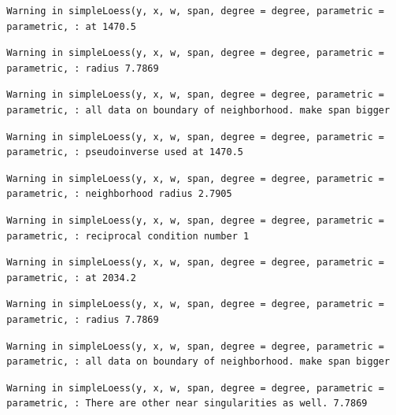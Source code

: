 \documentclass[12pt,twoside]{reedthesis}
\begin{document}
  \begin{verbatim}
  Warning in simpleLoess(y, x, w, span, degree = degree, parametric =
  parametric, : at 1470.5
  \end{verbatim}
  
  \begin{verbatim}
  Warning in simpleLoess(y, x, w, span, degree = degree, parametric =
  parametric, : radius 7.7869
  \end{verbatim}
  
  \begin{verbatim}
  Warning in simpleLoess(y, x, w, span, degree = degree, parametric =
  parametric, : all data on boundary of neighborhood. make span bigger
  \end{verbatim}
  
  \begin{verbatim}
  Warning in simpleLoess(y, x, w, span, degree = degree, parametric =
  parametric, : pseudoinverse used at 1470.5
  \end{verbatim}
  
  \begin{verbatim}
  Warning in simpleLoess(y, x, w, span, degree = degree, parametric =
  parametric, : neighborhood radius 2.7905
  \end{verbatim}
  
  \begin{verbatim}
  Warning in simpleLoess(y, x, w, span, degree = degree, parametric =
  parametric, : reciprocal condition number 1
  \end{verbatim}
  
  \begin{verbatim}
  Warning in simpleLoess(y, x, w, span, degree = degree, parametric =
  parametric, : at 2034.2
  \end{verbatim}
  
  \begin{verbatim}
  Warning in simpleLoess(y, x, w, span, degree = degree, parametric =
  parametric, : radius 7.7869
  \end{verbatim}
  
  \begin{verbatim}
  Warning in simpleLoess(y, x, w, span, degree = degree, parametric =
  parametric, : all data on boundary of neighborhood. make span bigger
  \end{verbatim}
  
  \begin{verbatim}
  Warning in simpleLoess(y, x, w, span, degree = degree, parametric =
  parametric, : There are other near singularities as well. 7.7869
  \end{verbatim}
  
\end{document}
